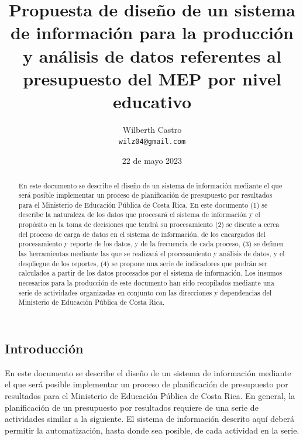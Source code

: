 \documentclass{article}
\begin{document}
\begin{multicols}{6}[]

\title{Propuesta de dise\~no de un sistema de informaci\'on para la producci\'on y an\'alisis de datos referentes al presupuesto del MEP por nivel educativo}

\author{
	Wilberth Castro \\
	\small{\texttt{wilz04@gmail.com}}
}

\date{\small{22 de mayo 2023}}

\maketitle


\begin{abstract}
	En este documento se describe el dise\~no de un sistema de informaci\'on mediante el que ser\'a posible implementar un proceso de planificaci\'on de presupuesto por resultados para el Ministerio de Educaci\'on P\'ublica de Costa Rica. En este documento (1) se describe la naturaleza de los datos que procesar\'a el sistema de informaci\'on y el prop\'osito en la toma de decisiones que tendr\'a su procesamiento (2) se discute a cerca del proceso de carga de datos en el sistema de informaci\'on, de los encargados del procesamiento y reporte de los datos, y de la frecuencia de cada proceso, (3) se definen las herramientas mediante las que se realizar\'a el procesamiento y an\'alisis de datos, y el despliegue de los reportes, (4) se propone una serie de indicadores que podr\'an ser calculados a partir de los datos procesados por el sistema de informaci\'on. Los insumos necesarios para la producci\'on de este documento han sido recopilados mediante una serie de actividades organizadas en conjunto con las direcciones y dependencias del Ministerio de Educaci\'on P\'ublica de Costa Rica.
\end{abstract}

\section{Introducci\'on} \label{sec:intro}

En este documento se describe el dise\~no de un sistema de informaci\'on mediante el que ser\'a posible implementar un proceso de planificaci\'on de presupuesto por resultados para el Ministerio de Educaci\'on P\'ublica de Costa Rica. En general, la planificaci\'on de un presupuesto por resultados requiere de una serie de actividades similar a la siguiente. El sistema de informaci\'on descrito aqu\'i deber\'a permitir la automatizaci\'on, hasta donde sea posible, de cada actividad en la serie.


\end{multicols}
\end{document}
